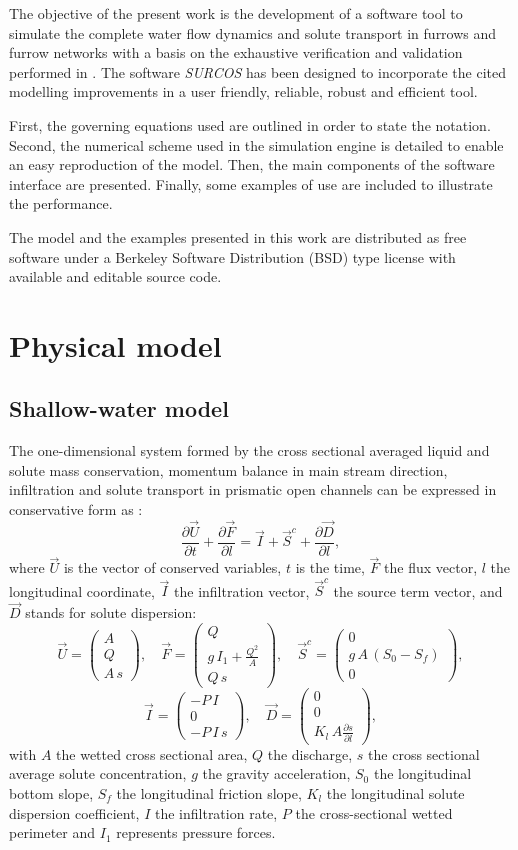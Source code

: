 \documentclass[review,authoryear]{elsarticle}
\newcommand{\eq}[2]{\begin{equation}\label{#2}#1\end{equation}}
\newcommand{\PARTIAL}[2] {\frac{\partial#1}{\partial#2}}
\newcommand{\PA}[1] {\left(#1\right)}
\newcommand{\MATRIX}[2] {\PA{\begin{array}{#1}#2\end{array}}}
\begin{document}
The objective of the present work is the development of a software tool to
simulate the complete water flow dynamics and solute transport in furrows and
furrow networks with a basis on the exhaustive verification and validation
performed in \cite{JaviSurcos1,JaviSurcos2}. The software \emph{SURCOS} has been
designed to incorporate the cited modelling improvements in a user friendly,
reliable, robust and efficient tool.

First, the governing equations used are outlined in order to state the notation.
Second, the numerical scheme used in the simulation engine is detailed to enable
an easy reproduction of the model. Then, the main components of the software
interface are presented. Finally, some examples of use are included to
illustrate the performance.

The model and the examples presented in this work are distributed
\citep{Surcos,SurcosGit} as free software under a Berkeley Software Distribution
(BSD) type license with available and editable source code.

\section{Physical model}

\subsection{Shallow-water model}

The one-dimensional system formed by the cross sectional averaged liquid and
solute mass conservation, momentum balance in main stream direction,
infiltration and solute transport in prismatic open channels can be expressed in
conservative form as \citep{JaviSurcos1}:
\eq
{
	\PARTIAL{\vec{U}}{t}+\PARTIAL{\vec{F}}{l}=
	\vec{I}+\vec{S}^c+\PARTIAL{\vec{D}}{l},
}{EqCons}
where $\vec{U}$ is the vector of conserved variables, $t$ is the time, $\vec{F}$
the flux vector,  $l$ the longitudinal coordinate, $\vec{I}$ the infiltration
vector, $\vec{S}^c$ the source term vector, and $\vec{D}$ stands for solute
dispersion:
\[
	\vec{U}=\MATRIX{c}{A\\Q\\A\,s},\quad
	\vec{F}=\MATRIX{c}{Q\\g\,I_1+\frac{Q^2}{A}\\Q\,s},\quad
	\vec{S}^c=\MATRIX{c}{0\\g\,A\,\PA{S_0-S_f}\\0},
\]
\eq
{
	\vec{I}=\MATRIX{c}{-P\,I\\0\\-P\,I\,s},\quad
	\vec{D}=\MATRIX{c}{0\\0\\K_l\,A\PARTIAL{s}{l}},
}{EqVar}
with $A$ the wetted cross sectional area, $Q$ the discharge, $s$ the cross
sectional average solute concentration, $g$ the gravity acceleration, $S_0$ the
longitudinal bottom slope, $S_f$ the longitudinal friction slope, $K_l$ the
longitudinal solute dispersion coefficient, $I$ the infiltration rate, $P$ the
cross-sectional wetted perimeter and $I_1$ represents pressure forces.
\end{document}
